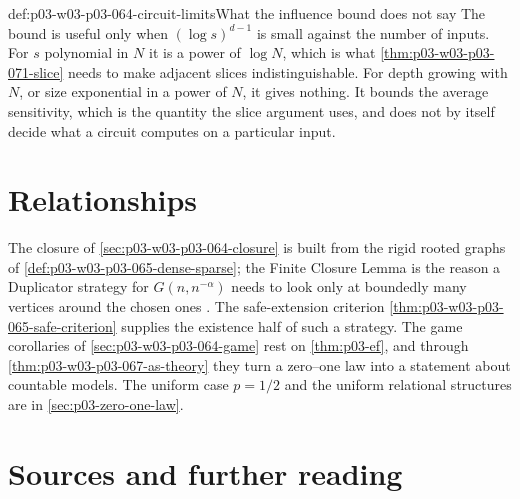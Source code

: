 \begin{hbwarning}{def:p03-w03-p03-064-circuit-limits}{What the influence bound does not say}
The bound is useful only when \((\log s)^{d-1}\) is small against the number
of inputs.  For \(s\) polynomial in \(N\) it is a power of \(\log N\), which
is what \cref{thm:p03-w03-p03-071-slice} needs to make adjacent slices
indistinguishable.  For depth growing with \(N\), or size exponential in a
power of \(N\), it gives nothing.  It bounds the average sensitivity, which
is the quantity the slice argument uses, and does not by itself decide what a
circuit computes on a particular input.
\end{hbwarning}

\section{Relationships}
\label{sec:p03-w03-p03-064-relationships}

The closure of \cref{sec:p03-w03-p03-064-closure} is built from the rigid
rooted graphs of \cref{def:p03-w03-p03-065-dense-sparse}; the Finite Closure
Lemma is the reason a Duplicator strategy for \(G(n,n^{-\alpha})\) needs to
look only at boundedly many vertices around the chosen ones
\cite[p.~11]{Spencer2007LogicRandomStructuresAuthor}.  The safe-extension
criterion \cref{thm:p03-w03-p03-065-safe-criterion} supplies the existence
half of such a strategy.  The game corollaries of
\cref{sec:p03-w03-p03-064-game} rest on \cref{thm:p03-ef}, and through
\cref{thm:p03-w03-p03-067-as-theory} they turn a zero--one law into a
statement about countable models.  The uniform case \(p=1/2\) and the
uniform relational structures are in \cref{sec:p03-zero-one-law}.

\section{Sources and further reading}
\label{sec:p03-w03-p03-064-sources}


